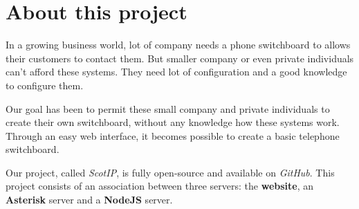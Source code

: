 \chapter{About this project}

In a growing business world, lot of company needs a phone switchboard to allows their customers to contact them.  But smaller company or even private individuals can't afford these systems. They need lot of configuration and a good knowledge to configure them. 
\newline

Our goal has been to permit these small company and private individuals to create their own switchboard, without any knowledge how these systems work. Through an easy web interface, it becomes possible to create a basic telephone switchboard.
\newline

Our project, called \textit{ScotIP}, is fully open-source and available on \textit{GitHub}. This project consists of an association between three servers: the \textbf{website}, an \textbf{Asterisk} server and a \textbf{NodeJS} server.

